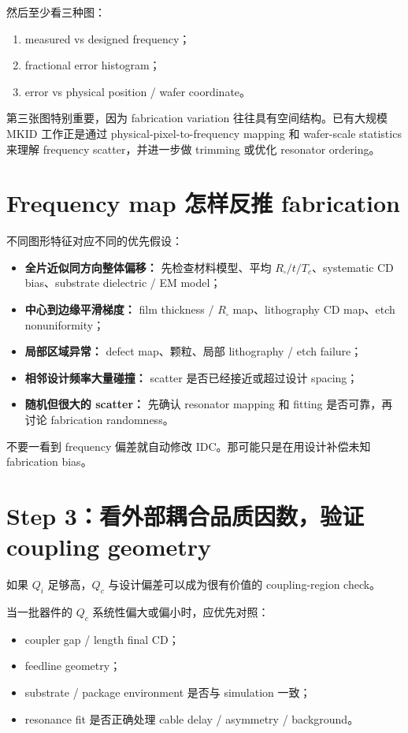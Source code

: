 然后至少看三种图：

\begin{enumerate}
  \item measured vs designed frequency；
  \item fractional error histogram；
  \item error vs physical position / wafer coordinate。
\end{enumerate}

第三张图特别重要，因为 fabrication variation 往往具有空间结构。已有大规模 MKID 工作正是通过 physical-pixel-to-frequency mapping 和 wafer-scale statistics 来理解 frequency scatter，并进一步做 trimming 或优化 resonator ordering。

\section{Frequency map 怎样反推 fabrication}

不同图形特征对应不同的优先假设：

\begin{itemize}
  \item \textbf{全片近似同方向整体偏移：} 先检查材料模型、平均 $R_\square/t/T_c$、systematic CD bias、substrate dielectric / EM model；
  \item \textbf{中心到边缘平滑梯度：} film thickness / $R_\square$ map、lithography CD map、etch nonuniformity；
  \item \textbf{局部区域异常：} defect map、颗粒、局部 lithography / etch failure；
  \item \textbf{相邻设计频率大量碰撞：} scatter 是否已经接近或超过设计 spacing；
  \item \textbf{随机但很大的 scatter：} 先确认 resonator mapping 和 fitting 是否可靠，再讨论 fabrication randomness。
\end{itemize}

不要一看到 frequency 偏差就自动修改 IDC。那可能只是在用设计补偿未知 fabrication bias。

\section{Step 3：看外部耦合品质因数，验证 coupling geometry}

如果 $Q_i$ 足够高，$Q_c$ 与设计偏差可以成为很有价值的 coupling-region check。

当一批器件的 $Q_c$ 系统性偏大或偏小时，应优先对照：

\begin{itemize}
  \item coupler gap / length final CD；
  \item feedline geometry；
  \item substrate / package environment 是否与 simulation 一致；
  \item resonance fit 是否正确处理 cable delay / asymmetry / background。
\end{itemize}

